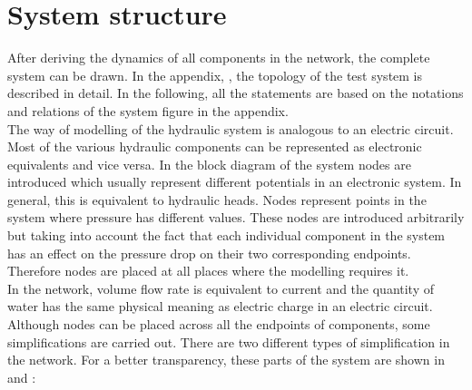 \section{System structure}  
\label{SystemModel}

After deriving the dynamics of all components in the network, the complete system can be drawn. In the appendix, , the topology of the test system is described in detail. In the following, all the statements are based on the notations and relations of the system figure in the appendix. 
\\
The way of modelling of the hydraulic system is analogous to an electric circuit. Most of the various hydraulic components can be represented as electronic equivalents and vice versa. In the block diagram of the system nodes are introduced which usually represent different potentials in an electronic system. In general, this is equivalent to hydraulic heads. Nodes represent points in the system where pressure has different values. These nodes are introduced arbitrarily but taking into account the fact that each individual component in the system has an effect on the pressure drop on their two corresponding endpoints. Therefore nodes are placed at all places where the modelling requires it. 
\\
In the network, volume flow rate is equivalent to current and the quantity of water has the same physical meaning as electric charge in an electric circuit. 
\\ 
Although nodes can be placed across all the endpoints of components, some simplifications are carried out. There are two different types of simplification in the network. For a better transparency, these parts of the system are shown in  and : 


